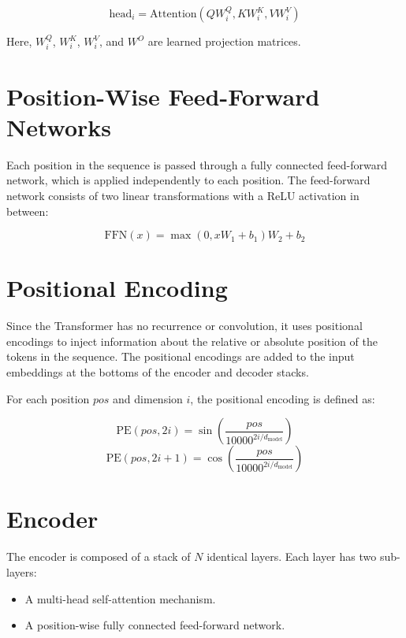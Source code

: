 \begin{equation}
\text{head}_i = \text{Attention}(QW_i^Q, KW_i^K, VW_i^V)
\end{equation}

Here, \( W_i^Q \), \( W_i^K \), \( W_i^V \), and \( W^O \) are learned projection matrices.

\section{Position-Wise Feed-Forward Networks}

Each position in the sequence is passed through a fully connected feed-forward network, which is applied independently to each position. The feed-forward network consists of two linear transformations with a ReLU activation in between:

\begin{equation}
\text{FFN}(x) = \max(0, xW_1 + b_1)W_2 + b_2
\end{equation}

\section{Positional Encoding}

Since the Transformer has no recurrence or convolution, it uses positional encodings to inject information about the relative or absolute position of the tokens in the sequence. The positional encodings are added to the input embeddings at the bottoms of the encoder and decoder stacks.

For each position \( pos \) and dimension \( i \), the positional encoding is defined as:

\begin{equation}
\text{PE}(pos, 2i) = \sin\left(\frac{pos}{10000^{2i/d_{\text{model}}}}\right)
\end{equation}
\begin{equation}
\text{PE}(pos, 2i+1) = \cos\left(\frac{pos}{10000^{2i/d_{\text{model}}}}\right)
\end{equation}

\section{Encoder}

The encoder is composed of a stack of \( N \) identical layers. Each layer has two sub-layers:

\begin{itemize}
    \item A multi-head self-attention mechanism.
    \item A position-wise fully connected feed-forward network.
\end{itemize}


